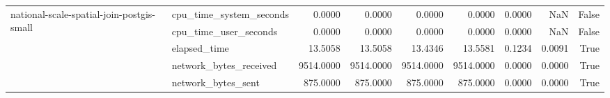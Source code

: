 \begin{tabular}{llrrrrrrr}
\cline{1-9}
\multirow[t]{5}{*}{national-scale-spatial-join-postgis-small} & cpu\_time\_system\_seconds & 0.0000 & 0.0000 & 0.0000 & 0.0000 & 0.0000 & NaN & False \\
 & cpu\_time\_user\_seconds & 0.0000 & 0.0000 & 0.0000 & 0.0000 & 0.0000 & NaN & False \\
 & elapsed\_time & 13.5058 & 13.5058 & 13.4346 & 13.5581 & 0.1234 & 0.0091 & True \\
 & network\_bytes\_received & 9514.0000 & 9514.0000 & 9514.0000 & 9514.0000 & 0.0000 & 0.0000 & True \\
 & network\_bytes\_sent & 875.0000 & 875.0000 & 875.0000 & 875.0000 & 0.0000 & 0.0000 & True \\
\cline{1-9}
\bottomrule
\end{tabular}
